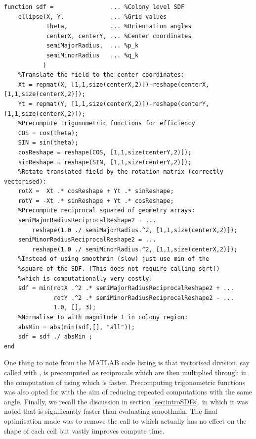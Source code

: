 \begin{lstlisting}[style=Matlab-editor,  
                   caption={A code listing for the \textbf{ellipse.m} script},
                   label={lst:ellipse}]
function sdf =                ... %Colony level SDF
    ellipse(X, Y,             ... %Grid values
            theta,            ... %Orientation angles
            centerX, centerY, ... %Center coordinates
            semiMajorRadius,  ... %p_k
            semiMinorRadius   ... %q_k       
           ) 
    %Translate the field to the center coordinates:
    Xt = repmat(X, [1,1,size(centerX,2)])-reshape(centerX, [1,1,size(centerX,2)]);
    Yt = repmat(Y, [1,1,size(centerX,2)])-reshape(centerY, [1,1,size(centerX,2)]);
    %Precompute trigonometric functions for efficiency
    COS = cos(theta);
    SIN = sin(theta);
    cosReshape = reshape(COS, [1,1,size(centerY,2)]);
    sinReshape = reshape(SIN, [1,1,size(centerY,2)]);
    %Rotate translated field by the rotation matrix (correctly vectorised):
    rotX =  Xt .* cosReshape + Yt .* sinReshape; 
    rotY = -Xt .* sinReshape + Yt .* cosReshape;
    %Precompute reciprocal squared of geometry arrays:
    semiMajorRadiusReciprocalReshape2 = ... 
        reshape(1.0 ./ semiMajorRadius.^2, [1,1,size(centerX,2)]);
    semiMinorRadiusReciprocalReshape2 = ...
        reshape(1.0 ./ semiMinorRadius.^2, [1,1,size(centerX,2)]);
    %Instead of using smoothmin (slow) just use min of the
    %square of the SDF. [This does not require calling sqrt() 
    %which is computationally very costly]
    sdf = min(rotX .^2 .* semiMajorRadiusReciprocalReshape2 + ...
              rotY .^2 .* semiMinorRadiusReciprocalReshape2 - ... 
              1.0, [], 3);
    %Normalise to with magnitude 1 in colony region:
    absMin = abs(min(sdf,[], "all"));
    sdf = sdf ./ absMin ;
end    
\end{lstlisting}

One thing to note from the MATLAB code listing is that 
vectorised division, say called with , 
is precomputed as reciprocals which 
are then multiplied through in the computation of  using  which is 
faster. Precomputing trigonometric functions was also opted for with 
the aim of reducing repeated computations with the same angle. 
Finally, we recall the discussion in section \ref{sec:introSDFs}, in which 
it was noted that  is significantly faster than evaluating smoothmin. 
The final optimisation made was to remove the call to  which  
actually has no effect on the shape of each cell but vastly improves
compute time.


